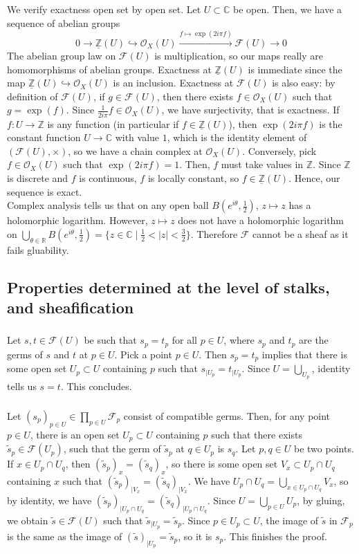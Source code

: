 \documentclass{article}
\newcommand{\Z}{\mathbb{Z}}
\newcommand{\R}{\mathbb{R}}
\newcommand{\C}{\mathbb{C}}
\newcommand{\Osheaf}{\mathscr{O}}
\newcommand{\Fsheaf}{\mathscr{F}}
\newcommand{\exercise}{\subsubsection} %
\begin{document}
\exercise{} We verify exactness open set by open set. Let $U \subset \C$ be open. Then, we have a sequence of abelian groups
\[0 \to \underline{\Z}(U) \hookrightarrow \Osheaf_X (U) \xrightarrow{f \mapsto \exp(2i\pi f)} \Fsheaf(U) \to 0\]
The abelian group law on $\Fsheaf(U)$ is multiplication, so our maps really are homomorphisms of abelian groups. Exactness at $\underline{\Z}(U)$ is immediate since the map $\underline{\Z}(U) \hookrightarrow \Osheaf_X (U)$ is an inclusion. Exactness at $\Fsheaf(U)$ is also easy: by definition of $\Fsheaf(U)$, if $g \in \Fsheaf(U)$, then there exists $f \in \Osheaf_X(U)$ such that $g = \exp(f)$. Since $\frac{1}{2i\pi} f \in \Osheaf_X(U)$, we have surjectivity, that is exactness. If $f : U \to \Z$ is any function (in particular if $f \in \underline{\Z}(U)$), then $\exp(2i\pi f)$ is the constant function $U \to \C$ with value $1$, which is the identity element of $(\Fsheaf(U),\times)$, so we have a chain complex at $\Osheaf_X(U)$. Conversely, pick $f \in \Osheaf_X(U)$ such that $\exp(2i\pi f) = 1$. Then, $f$ must take values in $\Z$. Since $\Z$ is discrete and $f$ is continuous, $f$ is locally constant, so $f \in \underline{\Z}(U)$. Hence, our sequence is exact. \\
Complex analysis tells us that on any open ball $B(e^{i\theta}, \frac{1}{2})$, $z \mapsto z$ has a holomorphic logarithm. However, $z\mapsto z$ does not have a holomorphic logarithm on $\bigcup_{\theta \in \R} B(e^{i\theta}, \frac{1}{2}) = \{z \in \C \mid \frac{1}{2} < |z| < \frac{3}{2}\}$. Therefore $\Fsheaf$ cannot be a sheaf as it fails gluability.

\subsection{Properties determined at the level of stalks, and sheafification}

\exercise{} Let $s,t \in \Fsheaf(U)$ be such that $s_p = t_p$ for all $p \in U$, where $s_p$ and $t_p$ are the germs of $s$ and $t$ at $p \in U$. Pick a point $p \in U$. Then $s_p = t_p$ implies that there is some open set $U_p \subset U$ containing $p$ such that $s_{\mid U_p} = t_{\mid U_p}$. Since $U = \bigcup_{U_p}$, identity tells us $s = t$. This concludes.

\exercise{} Let $(s_p)_{p \in U} \in \prod_{p \in U} \Fsheaf_p$ consist of compatible germs. Then, for any point $p \in U$, there is an open set $U_p \subset U$ containing $p$ such that there exists $\tilde{s}_p \in \Fsheaf(U_p)$, such that the germ of $\tilde{s}_p$ at $q \in U_p$ is $s_q$. Let $p,q \in U$ be two points. If $x \in U_p \cap U_q$, then $(\tilde{s}_p)_x = (\tilde{s}_q)_x$, so there is some open set $V_x \subset U_p \cap U_q$ containing $x$ such that $(\tilde{s}_p)_{\mid V_x} =(\tilde{s}_q)_{\mid V_x}$. We have $U_p \cap U_q = \bigcup_{x \in U_p \cap U_q} V_x$, so by identity, we have $(\tilde{s}_p)_{\mid U_p \cap U_q} = (\tilde{s}_q)_{\mid U_p \cap U_q}$. Since $U = \bigcup_{p \in U} U_p$, by gluing, we obtain $\tilde{s} \in \Fsheaf(U)$ such that $\tilde{s}_{\mid U_p} = \tilde{s}_p$. Since $p \in U_p \subset U$, the image of $\tilde{s}$ in $\Fsheaf_p$ is the same as the image of $(\tilde{s})_{\mid U_p} = \tilde{s}_p$, so it is $s_p$. This finishes the proof.
\end{document}
